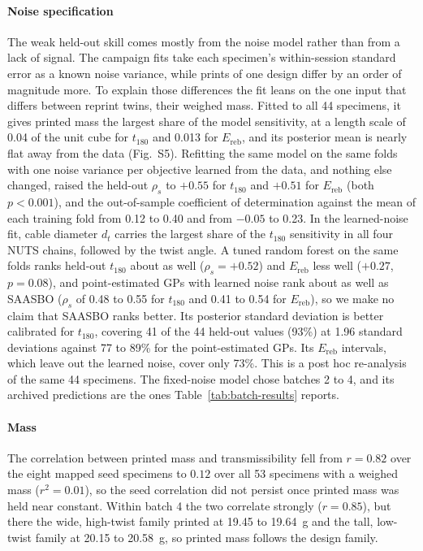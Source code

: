 \documentclass[11pt]{article}
\begin{document}
\paragraph{Noise specification} The weak held-out skill comes mostly
from the noise model rather than from a lack of signal. The campaign
fits take each specimen's within-session standard error as a known noise
variance, while prints of one design differ by an order of magnitude
more. To explain those differences the fit leans on the one input that
differs between reprint twins, their weighed mass. Fitted to all 44
specimens, it gives printed mass the largest share of the model
sensitivity, at a length scale of 0.04 of the unit cube for $t_{180}$
and 0.013 for $E_{\mathrm{reb}}$, and its posterior mean is nearly flat
away from the data (Fig.~S5). Refitting the same
model on the same folds with one noise variance per objective learned
from the data, and nothing else changed, raised the held-out $\rho_s$
to $+0.55$ for $t_{180}$ and $+0.51$ for $E_{\mathrm{reb}}$ (both
$p < 0.001$), and the out-of-sample coefficient of determination against
the mean of each training fold from 0.12 to 0.40 and from $-0.05$ to
0.23. In the learned-noise fit, cable diameter $d_t$ carries the largest
share of the $t_{180}$ sensitivity in all four NUTS chains, followed by
the twist angle. A tuned random forest on the same folds ranks held-out
$t_{180}$ about as well ($\rho_s = +0.52$) and $E_{\mathrm{reb}}$ less
well ($+0.27$, $p = 0.08$), and point-estimated GPs with learned noise
rank about as well as SAASBO ($\rho_s$ of 0.48 to 0.55 for $t_{180}$ and
0.41 to 0.54 for $E_{\mathrm{reb}}$), so we make no claim that SAASBO
ranks better. Its posterior standard deviation is better calibrated for
$t_{180}$, covering 41 of the 44 held-out values (93\%) at 1.96
standard deviations against 77 to 89\% for the point-estimated GPs. Its
$E_{\mathrm{reb}}$ intervals, which leave out the learned noise, cover
only 73\%. This is a
post hoc re-analysis of the same 44 specimens. The fixed-noise model
chose batches 2 to 4, and its archived predictions are the ones
Table~\ref{tab:batch-results} reports.

\paragraph{Mass} The correlation between printed mass and
transmissibility fell from $r = 0.82$ over the eight mapped seed
specimens to $0.12$ over all 53 specimens with a weighed mass ($r^2 = 0.01$), so the
seed correlation did not persist once printed mass was held near
constant. Within batch 4 the two correlate strongly
($r = 0.85$), but there the wide, high-twist family printed at 19.45 to
\SI{19.64}{g} and the tall, low-twist family at 20.15 to
\SI{20.58}{g}, so printed mass follows the design family.
\end{document}

